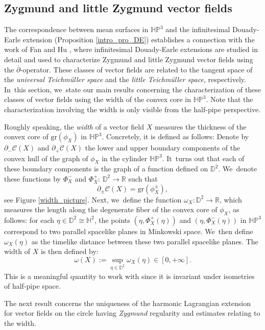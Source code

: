 \documentclass[10pt]{amsart}
\theoremstyle{plain}
\theoremstyle{definition}
\newcommand{\HP}{\mathbb{HP}^3}
\begin{document}
\subsection{Zygmund and little Zygmund vector fields}

The correspondence between mean surfaces in \(\HP \) and the infinitesimal Douady-Earle extension (Proposition \ref{intro_pro_DE}) establishes a connection with the work of Fan and Hu \cite{Fan_Hu_Little}, where infinitesimal Douady-Earle extensions are studied in detail and used to characterize Zygmund and little Zygmund vector fields using the \(\overline{\partial}\)-operator. These classes of vector fields are related to the tangent space of the \emph{universal Teichmüller space} and the \emph{little Teichmüller space}, respectively. In~this section, we~state our main results concerning the characterization of these classes of vector fields using the width of the convex core in \(\HP \). Note that the characterization involving the width is only visible from the half-pipe perspective.

Roughly speaking, the \emph{width} of a vector field \(X \) measures the thickness of the convex core of \(\mathrm{gr}(\phi_X) \) in \(\HP \). Concretely, it is defined as follows: Denote by \(\partial_{-}\mathcal{C}(X) \) and \(\partial_+\mathcal{C}(X) \) the lower and upper boundary components of the convex hull of the graph of \(\phi_X \) in the cylinder \(\HP \). It~turns out that each of these boundary components is the graph of a function defined on \(\mathbb{D}^2 \). We~denote these functions by \(\Phi_X^- \) and \(\Phi_X^+ \): \(\mathbb{D}^2 \to \mathbb{R} \) such that
\[
\partial_{\pm}\mathcal{C}(X) = \mathrm{gr}(\phi_X^{\pm}),
\]
see Figure \ref{width_picture}. Next, we~define the function \(\omega_X:\mathbb{D}^2\to\mathbb{R} \), which measures the length along the degenerate fiber of the convex core of \(\phi_X \), as follows: for each \(\eta \in \mathbb{D}^2 \cong \mathbb{H}^2 \), the points \((\eta,\Phi_X^+(\eta)) \) and \((\eta,\Phi_X^-(\eta)) \) in \(\HP \) correspond to two parallel spacelike planes in Minkowski space. We~then define \(\omega_X(\eta) \) as the timelike distance between these two parallel spacelike planes. The width of \(X \) is then defined by:
\[
\omega(X) := \sup_{\eta\in\mathbb{D}^2} \omega_X(\eta)\in[0,+\infty].
\]
This is a meaningful quantity to work with since it is invariant under isometries of half-pipe space.

The next result concerns the uniqueness of the harmonic Lagrangian extension for vector fields on the circle having \emph{Zygmund} regularity and estimates relating to the width.
\end{document}
